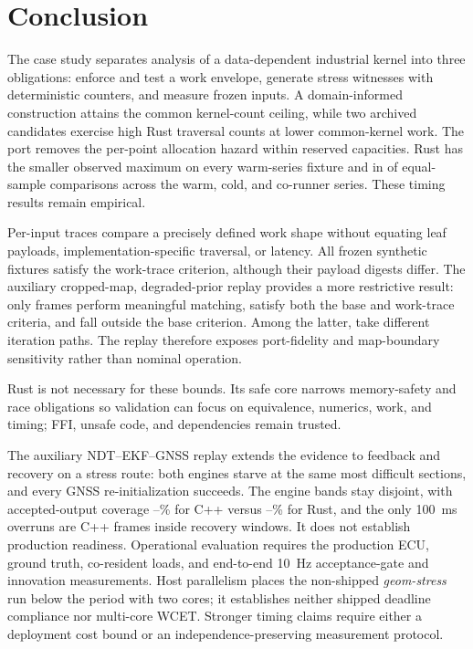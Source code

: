 \section{Conclusion}
\label{sec:conclusion}

The case study separates analysis of a data-dependent industrial kernel into three
obligations: enforce and test a work envelope, generate stress witnesses with deterministic
counters, and measure frozen inputs. A domain-informed construction attains the common
kernel-count ceiling, while two archived candidates exercise high Rust traversal counts at
lower common-kernel work. The port removes the per-point allocation hazard within
reserved capacities. Rust has the
smaller observed maximum on every warm-series fixture and in
\coRustLowerCells{} of \coPairedCells{} equal-sample comparisons across the warm, cold,
and co-runner series. These timing results remain empirical.

Per-input traces compare a precisely defined work shape without equating leaf payloads,
implementation-specific traversal, or latency. All frozen synthetic fixtures satisfy the
work-trace criterion, although their payload digests differ. The auxiliary cropped-map,
degraded-prior replay provides a more restrictive result: only \realOnMap{} frames perform
meaningful matching, \realShapeOnMap{} satisfy both the base and work-trace criteria, and
\realBaseDivergent{} fall outside the base criterion. Among the latter,
\realIterationDivergent{} take different iteration paths. The replay therefore exposes
port-fidelity and map-boundary sensitivity rather than nominal operation.

Rust is not necessary for these bounds. Its safe core narrows memory-safety and race
obligations so validation can focus on equivalence, numerics, work, and timing; FFI, unsafe
code, and dependencies remain trusted.

The auxiliary NDT--EKF--GNSS replay extends the evidence to feedback and recovery on a
stress route: both engines starve at the same most difficult sections, and every GNSS
re-initialization succeeds. The engine bands stay disjoint, with accepted-output coverage
\stackCppSurvMin--\stackCppSurvMax\% for C++ versus
\stackRustSurvMin--\stackRustSurvMax\% for Rust, and the only \SI{100}{ms} overruns
are C++ frames inside recovery windows. It does not establish production readiness.
Operational evaluation requires the production ECU, ground truth, co-resident loads, and
end-to-end \SI{10}{Hz} acceptance-gate and innovation measurements. Host parallelism places the
non-shipped \emph{geom-stress} run below the period with two cores; it establishes neither
shipped deadline compliance nor multi-core WCET. Stronger timing claims require either a
deployment cost bound or an independence-preserving measurement protocol.
